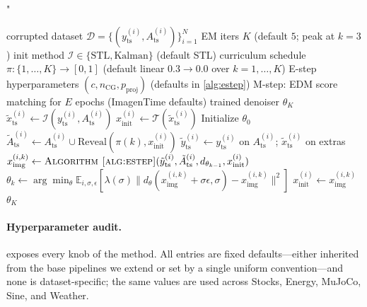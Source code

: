 "\documentclass{article}
\theoremstyle{plain}
\theoremstyle{definition}
\theoremstyle{remark}
\newcommand{\tsimg}{\mathcal{T}}
\newcommand{\Ats}{A_{\mathrm{ts}}}
\newcommand{\yts}{y_{\mathrm{ts}}}
\newcommand{\ximg}{x_{\mathrm{img}}}
\begin{document}
\begin{algorithm}[h]
\caption{Co-Evolving EM}
\label{alg:em}
\begin{algorithmic}[1]
\Require corrupted dataset $\mathcal{D} = \{(\yts^{(i)}, \Ats^{(i)})\}_{i=1}^N$
\Require EM iters $K$ (default $5$; peak at $k = 3$)
\Require init method $\mathcal{I} \in \{\mathrm{STL}, \mathrm{Kalman}\}$ (default STL)
\Require curriculum schedule $\pi : \{1, \ldots, K\} \to [0, 1]$ (default linear $0.3 \to 0.0$ over $k = 1, \ldots, K$)
\Require E-step hyperparameters $(c, n_{\mathrm{CG}}, p_{\mathrm{proj}})$ (defaults in \cref{alg:estep})
\Require M-step: EDM score matching for $E$ epochs (ImagenTime defaults)
\Ensure trained denoiser $\theta_K$
 
  \State $\tilde{x}_{\mathrm{ts}}^{(i)} \gets \mathcal{I}(\yts^{(i)}, \Ats^{(i)})$
  \State $x_{\mathrm{init}}^{(i)} \gets \tsimg(\tilde{x}_{\mathrm{ts}}^{(i)})$
\EndFor
\State Initialize $\theta_0$ 
   
    \State $\tilde{A}^{(i)}_{\mathrm{ts}} \gets \Ats^{(i)} \cup \mathrm{Reveal}(\pi(k), x_{\mathrm{init}}^{(i)})$
    \State $\tilde{y}^{(i)}_{\mathrm{ts}} \gets \yts^{(i)}$ on $\Ats^{(i)}$; $\tilde{x}^{(i)}_{\mathrm{ts}}$ on extras
  \EndFor
   
    \State $\ximg^{(i,k)} \gets \Call{Algorithm~\ref{alg:estep}}{\tilde{y}^{(i)}_{\mathrm{ts}}, \tilde{A}^{(i)}_{\mathrm{ts}}, d_{\theta_{k-1}}, x_{\mathrm{init}}^{(i)}}$
  \EndFor
  \State $\theta_k \gets \arg\min_\theta \mathbb{E}_{i, \sigma, \epsilon}[\lambda(\sigma) \|d_\theta(\ximg^{(i,k)} + \sigma\epsilon, \sigma) - \ximg^{(i,k)}\|^2]$ 
   $x_{\mathrm{init}}^{(i)} \gets \ximg^{(i,k)}$ \EndFor
\EndFor
\State \Return $\theta_K$
\end{algorithmic}
\end{algorithm}

\paragraph{Hyperparameter audit.}
 exposes every knob of the method. All entries are fixed defaults---either inherited from the base pipelines we extend or set by a single uniform convention---and none is dataset-specific; the same values are used across Stocks, Energy, MuJoCo, Sine, and Weather.
\end{document}
